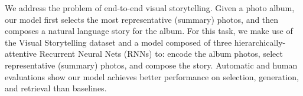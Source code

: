 We address the problem of end-to-end visual storytelling. Given a photo album, our model first selects the most representative (summary) photos, and then composes a natural language story for the album. For this task, we make use of the Visual Storytelling dataset and a model composed of three hierarchically-attentive Recurrent Neural Nets (RNNs) to: encode the album photos, select representative (summary) photos, and  compose the story. Automatic and human evaluations show our model achieves better performance on selection, generation, and retrieval than baselines.
